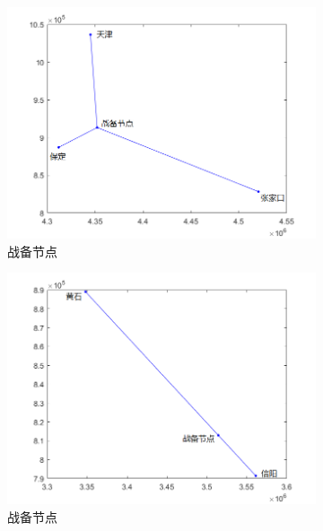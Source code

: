 \documentclass{article}
\begin{document}
\begin{figure}[htpb]
	\centering
	\begin{subfigure}[htpb]{.31\linewidth}
		\centering
		\includegraphics[width=\linewidth]{211.png}
		\caption{战备节点}
		\label{fig:战备节点\chinese{subfigure}\arabic{subsection}}
	\end{subfigure}
	\quad
	\begin{subfigure}[htpb]{.31\linewidth}
		\centering
		\includegraphics[width=\linewidth]{221.png}
		\caption{战备节点}
		\label{fig:战备节点\chinese{subfigure}\arabic{subsection}}
	\end{subfigure}
	\quad
	\begin{subfigure}[htpb]{.31\linewidth}

\end{subfigure}
\end{figure}
\end{document}
